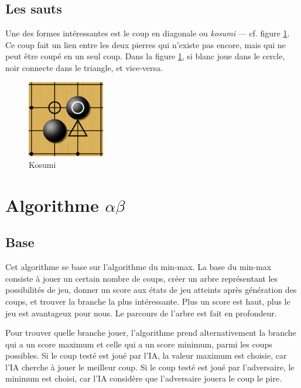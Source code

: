 \documentclass[11pt,a4paper,titlepage,french]{article}
\begin{document}
		\subsection{Les sauts}

			Une des formes intéressantes est le coup en diagonale ou \emph{kosumi} --- cf. figure \ref{kosumi}. Ce coup fait un lien entre les deux pierres qui n'existe pas encore, mais qui ne peut être coupé en un seul coup. Dans la figure \ref{kosumi}, si blanc joue dans le cercle, noir connecte dans le triangle, et vice-versa.

			\begin{figure}[hbt]
			\label{kosumi}
			\begin{center}
			\includegraphics[width=0.3\textwidth]{kosumi.png}
			\end{center}
			\caption{Kosumi}
			\end{figure}

	\section[Algorithme alpha beta]{Algorithme $\alpha\beta$}
	\label{alphab}
		\subsection{Base}
			Cet algorithme se base sur l'algorithme du min-max. La base du min-max consiste à jouer un certain nombre de coups, créer un arbre représentant les possibilités de jeu, donner un score aux états de jeu atteints après génération des coups, et trouver la branche la plus intéressante. Plus un score est haut, plus le jeu est avantageux pour nous. Le parcours de l'arbre est fait en profondeur.

			Pour trouver quelle branche jouer, l'algorithme prend alternativement la branche qui a un score maximum et celle qui a un score minimum, parmi les coups possibles. Si le coup testé est joué par l'IA, la valeur maximum est choisie, car l'IA cherche à jouer le meilleur coup. Si le coup testé est joué par l'adversaire, le minimum est choisi, car l'IA considère que l'adversaire jouera le coup le pire.
\end{document}
